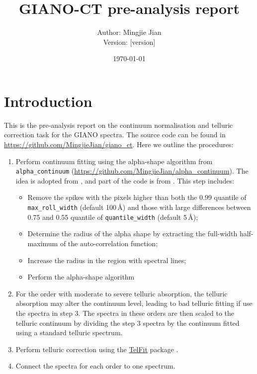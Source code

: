 \documentclass{article}
\title{GIANO-CT pre-analysis report}
\author{Author: Mingjie Jian \\Version: [version]}
\date{\today}
\begin{document}
\maketitle

\tableofcontents

\section{Introduction}

This is the pre-analysis report on the continuum normalisation and telluric correction task for the GIANO spectra. 
The source code can be found in \url{https://github.com/MingjieJian/giano_ct}.
Here we outline the procedures:
\begin{enumerate}
    \item Perform continuum fitting using the alpha-shape algorithm from \texttt{alpha\_continuum} (\url{https://github.com/MingjieJian/alpha_continuum}). The idea is adopted from \citet{Xu2019, Cretignier2020}, and part of the code is from \citet{Cretignier2020}. This step includes:
    \begin{itemize}
        \item Remove the spikes with the pixels higher than both the 0.99 quantile of \texttt{max\_roll\_width} (default 100\,\r{A}) and those with large differences between 0.75 and 0.55 quantile of \texttt{quantile\_width} (default 5\,\r{A});
        \item Determine the radius of the alpha shape by extracting the full-width half-maximum of the auto-correlation function;
        \item Increase the radius in the region with spectral lines;
        \item Perform the alpha-shape algorithm
    \end{itemize} 
    \item For the order with moderate to severe telluric absorption, the telluric absorption may alter the continuum level, leading to bad telluric fitting if use the spectra in step 3. The spectra in these orders are then scaled to the telluric continuum by dividing the step 3 spectra by the continuum fitted using a standard telluric spectrum.
    \item Perform telluric correction using the \hyperlink{https://github.com/kgullikson88/Telluric-Fitter}{TelFit} package \citep{Gullikson2014}.
    \item Connect the spectra for each order to one spectrum.
\end{enumerate}
\end{document}

